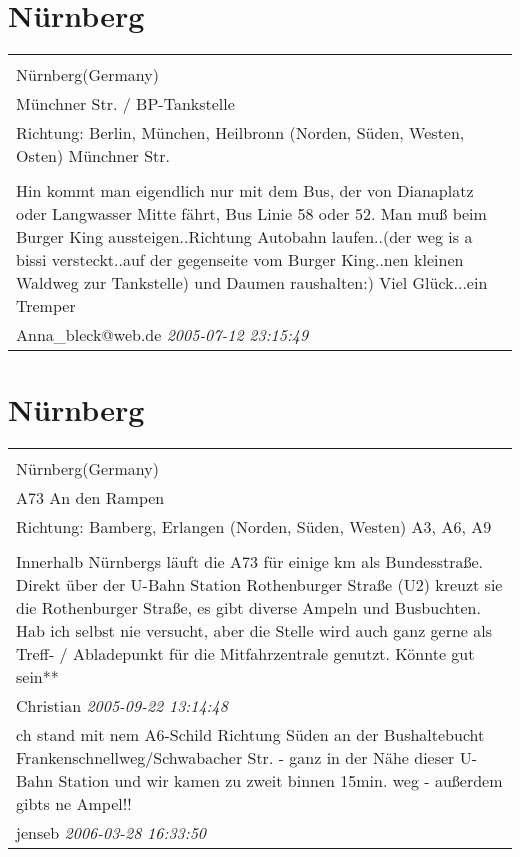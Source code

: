 \documentclass[a4paper,12pt]{article}
\begin{document}
\section{Nürnberg}
\begin{tabular}{|p{13cm}|}
\hline\\
Nürnberg(Germany)\\
Münchner Str. / BP-Tankstelle\\
Richtung: Berlin, München, Heilbronn (Norden, Süden, Westen, Osten) Münchner Str. \\
\hline\\
Hin kommt man eigendlich nur mit dem Bus, der von Dianaplatz oder Langwasser Mitte fährt, Bus Linie 58 oder 52. Man muß beim Burger King aussteigen..Richtung Autobahn laufen..(der weg is a bissi versteckt..auf der gegenseite vom Burger King..nen kleinen Waldweg zur Tankstelle) und Daumen raushalten:) Viel Glück...ein Tremper \\
Anna\_bleck@web.de \textit{ 2005-07-12 23:15:49 }\\\hline
\end{tabular}


\section{Nürnberg}
\begin{tabular}{|p{13cm}|}
\hline\\
Nürnberg(Germany)\\
A73 An den Rampen\\
Richtung: Bamberg, Erlangen (Norden, Süden, Westen) A3, A6, A9 \\
\hline\\
Innerhalb Nürnbergs läuft die A73 für einige km als Bundesstraße. Direkt über der U-Bahn Station Rothenburger Straße (U2) kreuzt sie die Rothenburger Straße, es gibt diverse Ampeln und Busbuchten. Hab ich selbst nie versucht, aber die Stelle wird auch ganz gerne als Treff- / Abladepunkt für die Mitfahrzentrale genutzt. Könnte gut sein** \\
Christian \textit{ 2005-09-22 13:14:48 }\\\hline ch stand mit nem A6-Schild Richtung Süden an der Bushaltebucht Frankenschnellweg/Schwabacher Str. - ganz in der Nähe dieser U-Bahn Station und wir kamen zu zweit binnen 15min. weg - außerdem gibts ne Ampel!! \\
jenseb \textit{ 2006-03-28 16:33:50 }\\\hline
\end{tabular}
\end{document}
